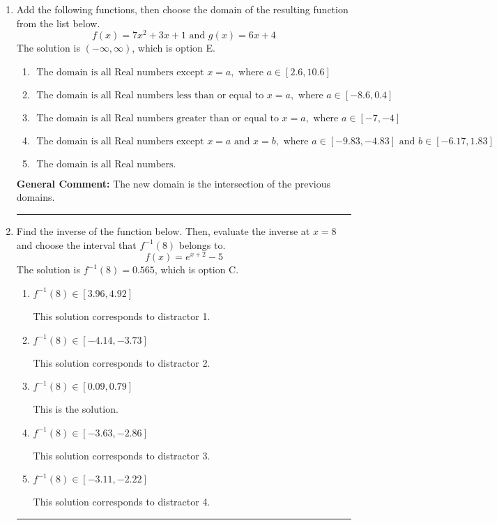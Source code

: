 \documentclass{extbook}[14pt]
\newcommand{\litem}[1]{\item #1

\rule{\textwidth}{0.4pt}}
\begin{document}
\begin{enumerate}\litem{
Add the following functions, then choose the domain of the resulting function from the list below.
\[ f(x) = 7x^{2} +3 x + 1 \text{ and } g(x) = 6x + 4 \]
The solution is \( (-\infty, \infty) \), which is option E.\begin{enumerate}[label=\Alph*.]
\item \( \text{ The domain is all Real numbers except } x = a, \text{ where } a \in [2.6, 10.6] \)


\item \( \text{ The domain is all Real numbers less than or equal to } x = a, \text{ where } a \in [-8.6, 0.4] \)


\item \( \text{ The domain is all Real numbers greater than or equal to } x = a, \text{ where } a \in [-7, -4] \)


\item \( \text{ The domain is all Real numbers except } x = a \text{ and } x = b, \text{ where } a \in [-9.83, -4.83] \text{ and } b \in [-6.17, 1.83] \)


\item \( \text{ The domain is all Real numbers. } \)


\end{enumerate}

\textbf{General Comment:} The new domain is the intersection of the previous domains.
}
\litem{
Find the inverse of the function below. Then, evaluate the inverse at $x = 8$ and choose the interval that $f^{-1}(8)$ belongs to.
\[ f(x) = e^{x+2}-5 \]
The solution is \( f^{-1}(8) = 0.565 \), which is option C.\begin{enumerate}[label=\Alph*.]
\item \( f^{-1}(8) \in [3.96, 4.92] \)

 This solution corresponds to distractor 1.
\item \( f^{-1}(8) \in [-4.14, -3.73] \)

 This solution corresponds to distractor 2.
\item \( f^{-1}(8) \in [0.09, 0.79] \)

 This is the solution.
\item \( f^{-1}(8) \in [-3.63, -2.86] \)

 This solution corresponds to distractor 3.
\item \( f^{-1}(8) \in [-3.11, -2.22] \)

 This solution corresponds to distractor 4.
\end{enumerate}

}
\end{enumerate}
\end{document}
